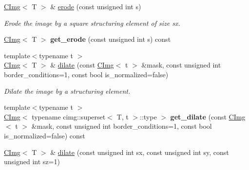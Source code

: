 \begin{DoxyCompactItemize}
\item 
\hypertarget{structcimg__library_1_1CImg_a05366c6b9033524db8b2978ec40cd83b}{
\hyperlink{structcimg__library_1_1CImg}{CImg}$<$ T $>$ \& \hyperlink{structcimg__library_1_1CImg_a05366c6b9033524db8b2978ec40cd83b}{erode} (const unsigned int s)}
\label{structcimg__library_1_1CImg_a05366c6b9033524db8b2978ec40cd83b}

\begin{DoxyCompactList}\small\item\em Erode the image by a square structuring element of size sx. \item\end{DoxyCompactList}\item 
\hypertarget{structcimg__library_1_1CImg_a54d34ac7f3c8abc6f7b1ffd7e0a094c8}{
\hyperlink{structcimg__library_1_1CImg}{CImg}$<$ T $>$ {\bfseries get\_\-erode} (const unsigned int s) const }
\label{structcimg__library_1_1CImg_a54d34ac7f3c8abc6f7b1ffd7e0a094c8}

\item 
\hypertarget{structcimg__library_1_1CImg_abc72139b20474add67f9d98a72a264f1}{
{\footnotesize template$<$typename t $>$ }\\\hyperlink{structcimg__library_1_1CImg}{CImg}$<$ T $>$ \& \hyperlink{structcimg__library_1_1CImg_abc72139b20474add67f9d98a72a264f1}{dilate} (const \hyperlink{structcimg__library_1_1CImg}{CImg}$<$ t $>$ \&mask, const unsigned int border\_\-conditions=1, const bool is\_\-normalized=false)}
\label{structcimg__library_1_1CImg_abc72139b20474add67f9d98a72a264f1}

\begin{DoxyCompactList}\small\item\em Dilate the image by a structuring element. \item\end{DoxyCompactList}\item 
\hypertarget{structcimg__library_1_1CImg_a9b1b7dd29a75fb3ddba08b52ba3b318b}{
{\footnotesize template$<$typename t $>$ }\\\hyperlink{structcimg__library_1_1CImg}{CImg}$<$ typename cimg::superset$<$ T, t $>$::type $>$ {\bfseries get\_\-dilate} (const \hyperlink{structcimg__library_1_1CImg}{CImg}$<$ t $>$ \&mask, const unsigned int border\_\-conditions=1, const bool is\_\-normalized=false) const }
\label{structcimg__library_1_1CImg_a9b1b7dd29a75fb3ddba08b52ba3b318b}

\item 
\hypertarget{structcimg__library_1_1CImg_a7601a95e86d694d4a8753dfe1ea0b254}{
\hyperlink{structcimg__library_1_1CImg}{CImg}$<$ T $>$ \& \hyperlink{structcimg__library_1_1CImg_a7601a95e86d694d4a8753dfe1ea0b254}{dilate} (const unsigned int sx, const unsigned int sy, const unsigned int sz=1)}
\label{structcimg__library_1_1CImg_a7601a95e86d694d4a8753dfe1ea0b254}


\end{DoxyCompactItemize}
